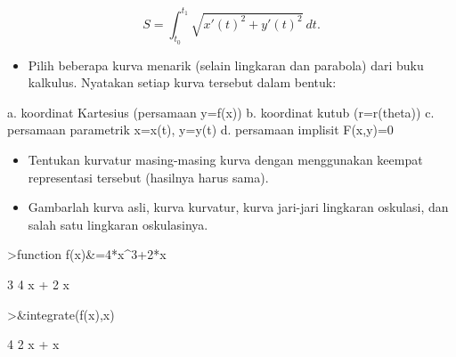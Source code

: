 \documentclass[a4paper,11pt,oneside,enabledeprecatedfontcommands]{scrbook}
\newenvironment{eulernotebook}{}{}
\newenvironment{eulercomment}{\par\medskip\noindent}{\par\medskip}
\newenvironment{eulerformula}{}{}
\begin{document}
\begin{eulernotebook}
\begin{eulercomment}
\begin{itemize}
\end{itemize}
\end{eulercomment}
\begin{eulerformula}
\[
S=\int_{t_0}^{t_1} \sqrt{x'(t)^2+y'(t)^2}\ dt.
\]
\end{eulerformula}
\begin{eulercomment}
\begin{itemize}
    \item Pilih beberapa kurva menarik (selain lingkaran dan parabola) dari buku kalkulus. Nyatakan setiap kurva tersebut dalam bentuk:
\end{itemize}
\end{eulercomment}
\begin{eulerttcomment}
  a. koordinat Kartesius (persamaan y=f(x))
  b. koordinat kutub (r=r(theta))
  c. persamaan parametrik x=x(t), y=y(t)
  d. persamaan implisit F(x,y)=0
\end{eulerttcomment}
\begin{eulercomment}
\begin{itemize}
    \item Tentukan kurvatur masing-masing kurva dengan menggunakan keempat representasi tersebut (hasilnya harus sama).
    \item Gambarlah kurva asli, kurva kurvatur, kurva jari-jari lingkaran oskulasi, dan salah satu lingkaran oskulasinya.
\end{itemize}
\end{eulercomment}
\begin{eulerprompt}
>function f(x)&=4*x^3+2*x
\end{eulerprompt}
\begin{euleroutput}
  
                                                  3
                                               4 x  + 2 x
  
\end{euleroutput}
\begin{eulerprompt}
>&integrate(f(x),x)
\end{eulerprompt}
\begin{euleroutput}
  
                                                  4    2
                                                 x  + x
  

\end{euleroutput}
\end{eulernotebook}
\end{document}
